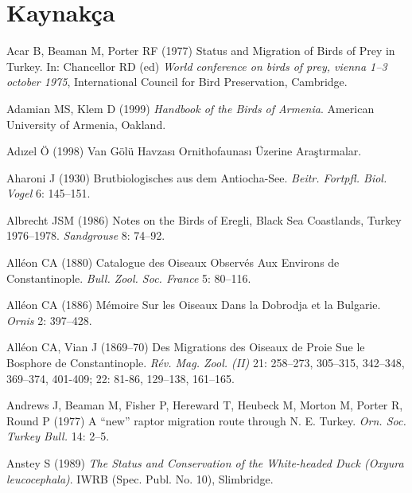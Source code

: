 \documentclass[
  letterpaper,
  DIV=11,
  numbers=noendperiod]{scrreprt}
\newlength{\cslhangindent}
\newenvironment{CSLReferences}[2] %
 {\begin{list}{}{%
  \setlength{\itemindent}{0pt}
  \setlength{\leftmargin}{0pt}
  \setlength{\parsep}{0pt}
  \ifodd #1
   \setlength{\leftmargin}{\cslhangindent}
   \setlength{\itemindent}{-1\cslhangindent}
  \fi
  \setlength{\itemsep}{#2\baselineskip}}}
 {\end{list}}
\begin{document}

\chapter*{Kaynakça}\label{kaynakuxe7a}


\label{refs}
\begin{CSLReferences}{0}{1}
Acar B, Beaman M, Porter RF (1977) {Status and Migration of Birds of
Prey in Turkey}. In: Chancellor RD (ed) \emph{World conference on birds
of prey, vienna 1--3 october 1975}, International Council for Bird
Preservation, Cambridge.

Adamian MS, Klem D (1999) \emph{{Handbook of the Birds of Armenia}}.
American University of Armenia, Oakland.

Adızel Ö (1998) {Van Gölü Havzası Ornithofaunası Üzerine Araştırmalar}.

Aharoni J (1930) {Brutbiologisches aus dem Antiocha-See}. \emph{Beitr.
Fortpfl. Biol. Vogel} 6: 145--151.

Albrecht JSM (1986) {Notes on the Birds of Eregli, Black Sea Coastlands,
Turkey 1976--1978}. \emph{Sandgrouse} 8: 74--92.

Alléon CA (1880) {Catalogue des Oiseaux Observés Aux Environs de
Constantinople}. \emph{Bull. Zool. Soc. France} 5: 80--116.

Alléon CA (1886) {Mémoire Sur les Oiseaux Dans la Dobrodja et la
Bulgarie}. \emph{Ornis} 2: 397--428.

Alléon CA, Vian J (1869--70) {Des Migrations des Oiseaux de Proie Sue le
Bosphore de Constantinople}. \emph{Rév. Mag. Zool. (II)} 21: 258--273,
305--315, 342--348, 369--374, 401-409; 22: 81-86, 129--138, 161--165.

Andrews J, Beaman M, Fisher P, Hereward T, Heubeck M, Morton M, Porter
R, Round P (1977) {A {``new''} raptor migration route through N. E.
Turkey}. \emph{Orn. Soc. Turkey Bull.} 14: 2--5.

Anstey S (1989) \emph{{The Status and Conservation of the White-headed
Duck ({Oxyura leucocephala})}}. IWRB (Spec. Publ. No. 10), Slimbridge.


\end{CSLReferences}
\end{document}
